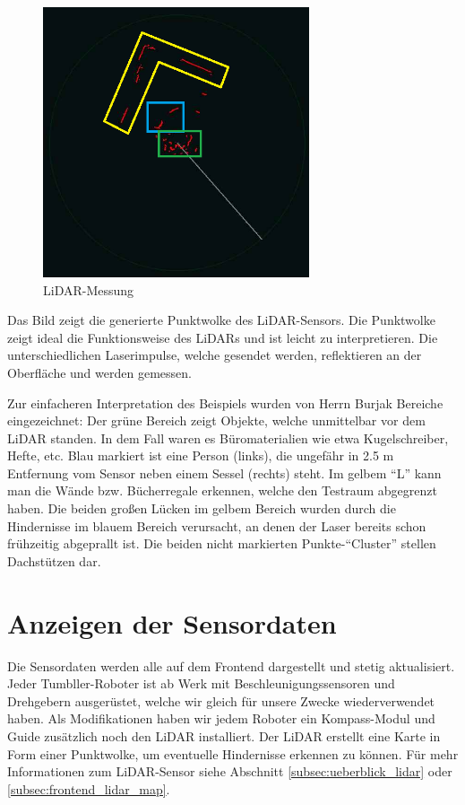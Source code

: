 \begin{figure}[H]
    \includegraphics[width=0.7\textwidth, center]{img/LiDARMessungZeichnung_alt.png}
    \caption{LiDAR-Messung}
    \label{fig:LiDAR-Messung}
\end{figure}

Das Bild zeigt die generierte Punktwolke des LiDAR-Sensors.
%
Die Punktwolke zeigt ideal die Funktionsweise des LiDARs
und ist leicht zu interpretieren.
%
Die unterschiedlichen Laserimpulse,
welche gesendet werden,
reflektieren an der Oberfläche und werden gemessen.

Zur einfacheren Interpretation des Beispiels
wurden von Herrn Burjak Bereiche eingezeichnet:
%
Der grüne Bereich zeigt Objekte,
welche unmittelbar vor dem LiDAR standen.
%
In dem Fall waren es Büromaterialien wie etwa Kugelschreiber, Hefte, etc.
%
Blau markiert ist eine Person (links),
die ungefähr in 2.5 m Entfernung vom Sensor
neben einem Sessel (rechts) steht.
%
Im gelbem ``L'' kann man die Wände bzw. Bücherregale erkennen,
welche den Testraum abgegrenzt haben.
Die beiden großen Lücken im gelbem Bereich wurden
durch die Hindernisse im blauem Bereich verursacht,
an denen der Laser bereits schon frühzeitig abgeprallt ist.
%
Die beiden nicht markierten Punkte-``Cluster'' stellen Dachstützen dar.

\section{Anzeigen der Sensordaten}
\label{subsec:frontend_sensors}
Die Sensordaten werden alle auf dem Frontend dargestellt und stetig aktualisiert.
%
Jeder Tumbller-Roboter ist ab Werk mit Beschleunigungssensoren und Drehgebern ausgerüstet,
welche wir gleich für unsere Zwecke wiederverwendet haben.
%
Als Modifikationen haben wir jedem Roboter ein Kompass-Modul
und Guide zusätzlich noch den LiDAR installiert.
%
Der LiDAR erstellt eine Karte in Form einer Punktwolke,
um eventuelle Hindernisse erkennen zu können.
%
Für mehr Informationen zum LiDAR-Sensor siehe Abschnitt \ref{subsec:ueberblick_lidar} oder \ref{subsec:frontend_lidar_map}.

